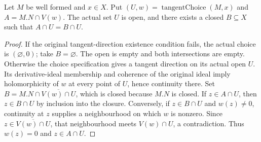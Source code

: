\begin{lemma}
\label{hir:original-chosen-contact-closed-representative}
\leanok
{}
Let $M$ be well formed and $x\in X$.  Put $(U,w)=\operatorname{tangentChoice}(M,x)$
and $A=M.N\cap V(w)$.  The actual set $U$ is open, and there exists a closed
$B\subseteq X$ such that $A\cap U=B\cap U$.
\end{lemma}
\begin{proof}
If the original tangent-direction existence condition fails, the actual
choice is $(\varnothing,0)$; take $B=\varnothing$.  The open is empty and
both intersections are empty.  Otherwise the choice specification gives
a tangent direction on its actual open $U$.  Its derivative-ideal membership
and coherence of the original ideal imply holomorphicity of $w$ at every
point of $U$, hence continuity there.  Set
$B=M.N\cap\overline{V(w)\cap U}$, which is closed because $M.N$ is closed.
If $z\in A\cap U$, then $z\in B\cap U$ by inclusion into the closure.
Conversely, if $z\in B\cap U$ and $w(z)\ne0$, continuity at $z$ supplies
a neighbourhood on which $w$ is nonzero.  Since
$z\in\overline{V(w)\cap U}$, that neighbourhood meets $V(w)\cap U$, a
contradiction.  Thus $w(z)=0$ and $z\in A\cap U$.
\end{proof}

